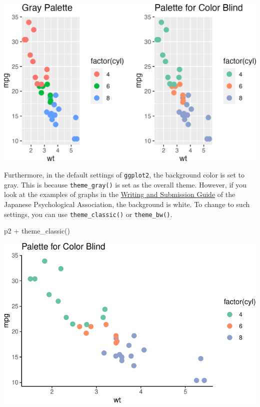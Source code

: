 \documentclass[
  a4paper,
]{book}
\newenvironment{Shaded}{\begin{snugshade}}{\end{snugshade}}
\newcommand{\FunctionTok}[1]{\textcolor[rgb]{0.28,0.35,0.67}{#1}}
\newcommand{\NormalTok}[1]{\textcolor[rgb]{0.00,0.23,0.31}{#1}}
\newcommand{\SpecialCharTok}[1]{\textcolor[rgb]{0.37,0.37,0.37}{#1}}
\begin{document}
\includegraphics{chapter04_files/figure-pdf/unnamed-chunk-2-1.png}

Furthermore, in the default settings of \texttt{ggplot2}, the background
color is set to gray. This is because \texttt{theme\_gray()} is set as
the overall theme. However, if you look at the examples of graphs in the
\href{https://psych.or.jp/manual/}{Writing and Submission Guide} of the
Japanese Psychological Association, the background is white. To change
to such settings, you can use \texttt{theme\_classic()} or
\texttt{theme\_bw()}.

\begin{Shaded}
\begin{Highlighting}[]
\NormalTok{p2 }\SpecialCharTok{+} \FunctionTok{theme\_classic}\NormalTok{()}
\end{Highlighting}
\end{Shaded}

\includegraphics{chapter04_files/figure-pdf/unnamed-chunk-3-1.pdf}
\end{document}
